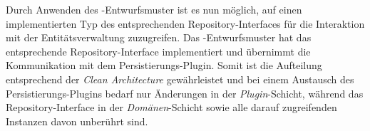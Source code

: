 Durch Anwenden des -Entwurfsmuster ist es nun möglich, auf einen implementierten Typ des entsprechenden Repository-Interfaces für die Interaktion mit der Entitätsverwaltung zuzugreifen.
Das -Entwurfsmuster hat das entsprechende Repository-Interface implementiert und übernimmt die Kommunikation mit dem Persistierungs-Plugin.
Somit ist die Aufteilung entsprechend der \textit{Clean Architecture} gewährleistet und bei einem Austausch des Persistierungs-Plugins bedarf nur Änderungen in der \textit{Plugin}-Schicht, während das Repository-Interface in der \textit{Domänen}-Schicht sowie alle darauf zugreifenden Instanzen davon unberührt sind.
